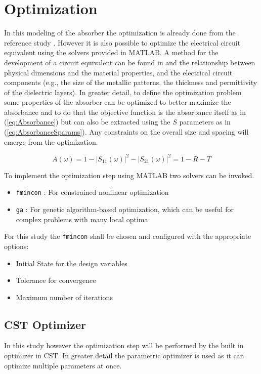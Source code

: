 \section{\textsf{Optimization}}
    In this modeling of the absorber the optimization is already done from the reference
    study \cite{zhang_design_2023}. However it is also possible to optimize the electrical
    circuit equivalent using the solvers provided in MATLAB. A method for the development
    of a circuit equivalent can be found in \cite{jha_design_2018} and the relationship
    between physical dimensions and the material properties, and the electrical circuit
    components (e.g., the size of the metallic patterns, the thickness and permittivity 
    of the dielectric layers). In greater detail, to define the optimization problem some
    properties of the absorber can be optimized to better maximize the absorbance and to
    do that the objective function is the absorbance itself as in (\ref{eq:Absorbance}) but
    can also be extracted using the $S$ parameters as in (\ref{eq:AbsorbanceSparams}). Any
    constraints on the overall size and spacing will emerge from the optimization.

    \begin{equation}
        \label{eq:AbsorbanceSparams}
        A(\omega) = 1 - |S_{11}(\omega)|^2 - |S_{21}(\omega)|^2 = 1 - R - T
    \end{equation}

    To implement the optimization step using MATLAB two solvers can be invoked.
    \begin{itemize}
        \item \texttt{fmincon} : For constrained nonlinear optimization
        \item \texttt{ga} : For genetic algorithm-based optimization, which can be useful 
            for complex problems with many local optima
    \end{itemize}

    For this study the \texttt{fmincon} shall be chosen and configured with the appropriate
    options:
    \begin{itemize}
        \item Initial State for the design variables
        \item Tolerance for convergence
        \item Maximum number of iterations
    \end{itemize}

    \subsection{\textsf{CST Optimizer}}
        In this study however the optimization step will be performed by the built in optimizer
        in CST. In greater detail the parametric optimizer is used as it can optimize multiple
        parameters at once.

